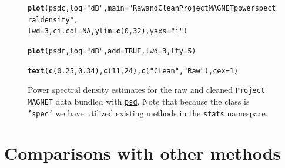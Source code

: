 \documentclass[10pt]{article}\usepackage[]{graphicx}\usepackage[]{color}
\makeatletter
\newcommand{\hlnum}[1]{\textcolor[rgb]{0.686,0.059,0.569}{#1}}%
\newcommand{\hlstr}[1]{\textcolor[rgb]{0.192,0.494,0.8}{#1}}%
\newcommand{\hlstd}[1]{\textcolor[rgb]{0.345,0.345,0.345}{#1}}%
\newcommand{\hlkwc}[1]{\textcolor[rgb]{0.333,0.667,0.333}{#1}}%
\newcommand{\hlkwd}[1]{\textcolor[rgb]{0.737,0.353,0.396}{\textbf{#1}}}%
\newenvironment{kframe}{%
 \def\at@end@of@kframe{}%
 \ifinner\ifhmode%
  \def\at@end@of@kframe{\end{minipage}}%
  \begin{minipage}{\columnwidth}%
 \fi\fi%
 \def\FrameCommand##1{\hskip\@totalleftmargin \hskip-\fboxsep
 \colorbox{shadecolor}{##1}\hskip-\fboxsep
     \hskip-\linewidth \hskip-\@totalleftmargin \hskip\columnwidth}%
 \MakeFramed {\advance\hsize-\width
   \@totalleftmargin\z@ \linewidth\hsize
   \@setminipage}}%
 {\par\unskip\endMakeFramed%
 \at@end@of@kframe}
\newenvironment{knitrout}{}{} %
\newcommand{\Rcmd}[1]{\texttt{#1}}
\newcommand{\psd}[0]{\href{http://www.github.com/abarbour/psd/}{\color{blue}\Rcmd{psd}}}
\makeatother
\begin{document}
\begin{figure}[h!]
\begin{center}
\begin{knitrout}
\color{fgcolor}\begin{kframe}
\begin{alltt}
\hlkwd{plot}\hlstd{(psdc,} \hlkwc{log}\hlstd{=}\hlstr{"dB"}\hlstd{,} \hlkwc{main}\hlstd{=}\hlstr{"Raw and Clean Project MAGNET power spectral density"}\hlstd{,}
       \hlkwc{lwd}\hlstd{=}\hlnum{3}\hlstd{,} \hlkwc{ci.col}\hlstd{=}\hlnum{NA}\hlstd{,} \hlkwc{ylim}\hlstd{=}\hlkwd{c}\hlstd{(}\hlnum{0}\hlstd{,}\hlnum{32}\hlstd{),} \hlkwc{yaxs}\hlstd{=}\hlstr{"i"}\hlstd{)}
\end{alltt}


{\ttfamily\noindent\bfseries{}}\begin{alltt}
\hlkwd{plot}\hlstd{(psdr,} \hlkwc{log}\hlstd{=}\hlstr{"dB"}\hlstd{,} \hlkwc{add}\hlstd{=}\hlnum{TRUE}\hlstd{,} \hlkwc{lwd}\hlstd{=}\hlnum{3}\hlstd{,} \hlkwc{lty}\hlstd{=}\hlnum{5}\hlstd{)}
\end{alltt}


{\ttfamily\noindent\bfseries{}}\begin{alltt}
\hlkwd{text}\hlstd{(}\hlkwd{c}\hlstd{(}\hlnum{0.25}\hlstd{,}\hlnum{0.34}\hlstd{),} \hlkwd{c}\hlstd{(}\hlnum{11}\hlstd{,}\hlnum{24}\hlstd{),} \hlkwd{c}\hlstd{(}\hlstr{"Clean"}\hlstd{,}\hlstr{"Raw"}\hlstd{),} \hlkwc{cex}\hlstd{=}\hlnum{1}\hlstd{)}
\end{alltt}


{\ttfamily\noindent\bfseries{}}\end{kframe}
\end{knitrout}
\caption{Power spectral density estimates for the raw and cleaned
             \Rcmd{Project MAGNET} data bundled with \psd{}. Note that
             because the class is \Rcmd{'spec'} we have
             utilized  existing methods in the \Rcmd{stats} namespace.}
\label{fig:pmag}
\end{center}
\end{figure}

\section{Comparisons with other methods}
\end{document}

